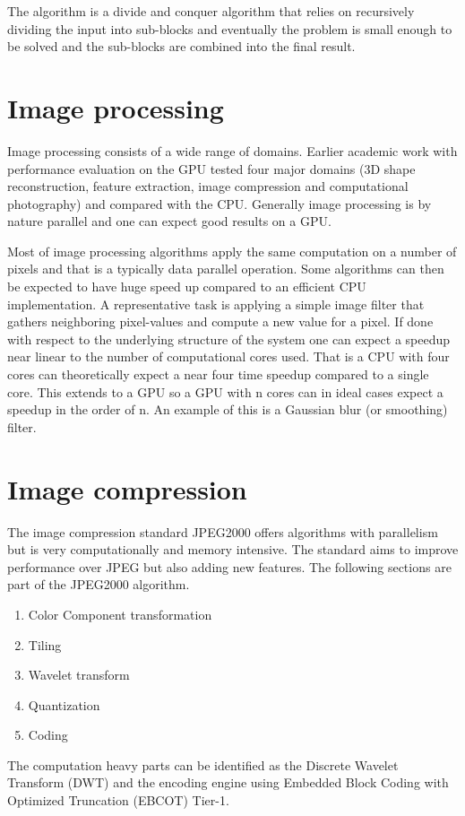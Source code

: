 The algorithm is a divide and conquer algorithm that relies on recursively dividing the input into sub-blocks and eventually the problem is small enough to be solved and the sub-blocks are combined into the final result.
\section{Image processing}
Image processing consists of a wide range of domains. Earlier academic work with performance evaluation on the GPU\cite{Park2011} tested four major domains (3D shape reconstruction, feature extraction, image compression and computational photography) and compared with the CPU. Generally image processing is by nature parallel and one can expect good results on a GPU.

Most of image processing algorithms apply the same computation on a number of pixels and that is a typically data parallel operation. Some algorithms can then be expected to have huge speed up compared to an efficient CPU implementation. A representative task is applying a simple image filter that gathers neighboring pixel-values and compute a new value for a pixel. If done with respect to the underlying structure of the system one can expect a speedup near linear to the number of computational cores used. That is a CPU with four cores can theoretically expect a near four time speedup compared to a single core. This extends to a GPU so a GPU with n cores can in ideal cases expect a speedup in the order of n. An example of this is a Gaussian blur (or smoothing) filter.

\section{Image compression}
The image compression standard JPEG2000 offers algorithms with parallelism but is very computationally and memory intensive. The standard aims to improve performance over JPEG but also adding new features. The following sections are part of the JPEG2000 algorithm\cite{Christopoulos2000}.
\begin{enumerate}
	\item Color Component transformation
	\item Tiling
	\item Wavelet transform
	\item Quantization
	\item Coding
\end{enumerate}

The computation heavy parts can be identified as the Discrete Wavelet Transform (DWT) and the encoding engine using Embedded Block Coding with Optimized Truncation (EBCOT) Tier-1.

